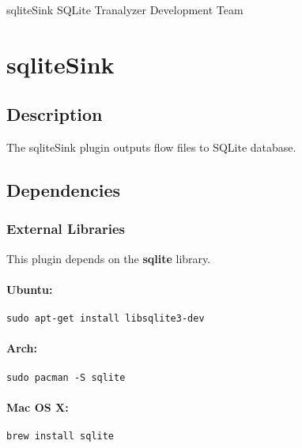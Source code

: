 \documentclass[documentation]{subfiles}
\begin{document}
\trantitle
    {sqliteSink} %
    {SQLite} %
    {Tranalyzer Development Team} %

\section{sqliteSink}\label{s:sqliteSink}

\subsection{Description}
The sqliteSink plugin outputs flow files to SQLite database.

\subsection{Dependencies}

\subsubsection{External Libraries}
This plugin depends on the {\bf sqlite} library.
\paragraph{Ubuntu:} {\tt sudo apt-get install libsqlite3-dev}
\paragraph{Arch:} {\tt sudo pacman -S sqlite}
\paragraph{Mac OS X:} {\tt brew install sqlite}
\end{document}
